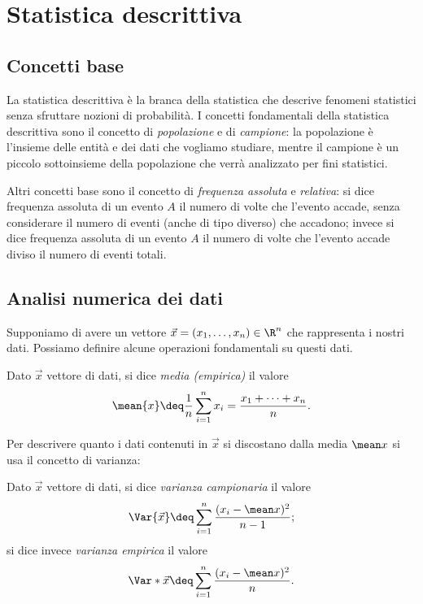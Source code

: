 \chapter{Statistica descrittiva}

\section{Concetti base}

La statistica descrittiva è la branca della statistica che descrive fenomeni statistici senza sfruttare nozioni di probabilità. I concetti fondamentali della statistica descrittiva sono il concetto di \emph{popolazione} e di \emph{campione}: la popolazione è l'insieme delle entità e dei dati che vogliamo studiare, mentre il campione è un piccolo sottoinsieme della popolazione che verrà analizzato per fini statistici.

Altri concetti base sono il concetto di \emph{frequenza assoluta} e \emph{relativa}: si dice frequenza assoluta di un evento $A$ il numero di volte che l'evento accade, senza considerare il numero di eventi (anche di tipo diverso) che accadono; invece si dice frequenza assoluta di un evento $A$ il numero di volte che l'evento accade diviso il numero di eventi totali.

\section{Analisi numerica dei dati}

Supponiamo di avere un vettore $\vec{x} = (x_1, \dots, x_n) \in \R^n$ che rappresenta i nostri dati. Possiamo definire alcune operazioni fondamentali su questi dati.

\begin{definition}
     Dato $\vec x$ vettore di dati, si dice \emph{media (empirica)} il valore \begin{equation}
        \mean{x} \deq \frac{1}{n}\sum_{i=1}^n x_i = \frac{x_1 + \dots + x_n}{n}.
    \end{equation}
\end{definition}

Per descrivere quanto i dati contenuti in $\vec x$ si discostano dalla media $\mean x$ si usa il concetto di varianza:
\begin{definition}
    [Varianza] Dato $\vec x$ vettore di dati, si dice \emph{varianza campionaria} il valore \begin{equation}
        \Var{\vec x} \deq \sum_{i=1}^n \frac{(x_i - \mean x)^2}{n-1};
    \end{equation} si dice invece \emph{varianza empirica} il valore \begin{equation}
        \Var*{\vec x} \deq \sum_{i=1}^n \frac{(x_i - \mean x)^2}{n}.
    \end{equation}
\end{definition}

